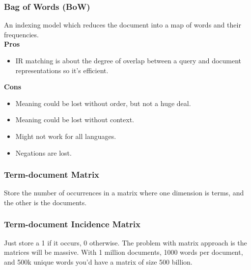 \documentclass[11pt]{article}
\begin{document}
\subsubsection{Bag of Words (BoW)}
An indexing model which reduces the document into a map of words and their frequencies.\\
\newline
\textbf{Pros}
\begin{itemize}
    \item IR matching is about the degree of overlap between a query and document representations so it's efficient.
\end{itemize}
\textbf{Cons}
\begin{itemize}
    \item Meaning could be lost without order, but not a huge deal.
    \item Meaning could be lost without context.
    \item Might not work for all languages.
    \item Negations are lost.
\end{itemize}

\subsubsection{Term-document Matrix}
Store the number of occurrences in a matrix where one dimension is terms, and the other is the documents.

\subsubsection{Term-document Incidence Matrix}
Just store a 1 if it occurs, 0 otherwise.
\newline\newline
The problem with matrix approach is the matrices will be massive. With 1 million documents, 1000 words per document, and 500k unique words you'd have a matrix of size 500 billion.
\end{document}
